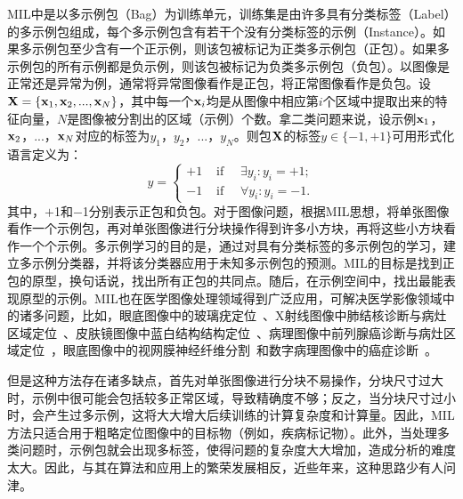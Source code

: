 MIL中是以多示例包（Bag）为训练单元，训练集是由许多具有分类标签（Label）的多示例包组成，每个多示例包含有若干个没有分类标签的示例（Instance）。如果多示例包至少含有一个正示例，则该包被标记为正类多示例包（正包）。如果多示例包的所有示例都是负示例，则该包被标记为负类多示例包（负包）。以图像是正常还是异常为例，通常将异常图像看作是正包，将正常图像看作是负包。设$\mathbf{X}=\{\mathbf{x}_1,\mathbf{x}_2,...,\mathbf{x}_N\}$，其中每一个$\mathbf{x}_i$均是从图像中相应第$i$个区域中提取出来的特征向量，$N$是图像被分割出的区域（示例）个数。拿二类问题来说，设示例${\mathbf{x}_1}$，$\mathbf{x}_2$，...，$\mathbf{x}_N$对应的标签为${y_1}$，${y_2}$，...，${y_N}$。则包$\mathbf{X}$的标签$y\in \{-1,+1\}$可用形式化语言定义为：
\begin{equation}
y=\left\{\begin{array}{ll}
{+1} & {\text { if } \quad \exists {y}_{i}: {y}_{i}=+1;} \\
{-1} & {\text { if } \quad \forall {y}_{i}: {y}_{i}=-1.}
\end{array}\right.
\end{equation}
其中，$+$1和$-$1分别表示正包和负包。对于图像问题，根据MIL思想，将单张图像看作一个示例包，再对单张图像进行分块操作得到许多小方块，再将这些小方块看作一个个示例。多示例学习的目的是，通过对具有分类标签的多示例包的学习，建立多示例分类器，并将该分类器应用于未知多示例包的预测。MIL的目标是找到正包的原型，换句话说，找出所有正包的共同点。随后，在示例空间中，找出最能表现原型的示例。MIL也在医学图像处理领域得到广泛应用，可解决医学影像领域中的诸多问题，比如，眼底图像中的玻璃疣定位~\cite{lu2015effective}、X射线图像中肺结核诊断与病灶区域定位~\cite{melendez2014novel}、皮肤镜图像中蓝白结构结构定位~\cite{madooei2018learning}、病理图像中前列腺癌诊断与病灶区域定位~\cite{campanella2018terabyte}，眼底图像中的视网膜神经纤维分割~\cite{manivannan2017subcategory}和数字病理图像中的癌症诊断~\cite{kandemir2014empowering}。

但是这种方法存在诸多缺点，首先对单张图像进行分块不易操作，分块尺寸过大时，示例中很可能会包括较多正常区域，导致精确度不够；反之，当分块尺寸过小时，会产生过多示例，这将大大增大后续训练的计算复杂度和计算量。因此，MIL方法只适合用于粗略定位图像中的目标物（例如，疾病标记物）。此外，当处理多类问题时，示例包就会出现多标签，使得问题的复杂度大大增加，造成分析的难度太大。因此，与其在算法和应用上的繁荣发展相反，近些年来，这种思路少有人问津。

